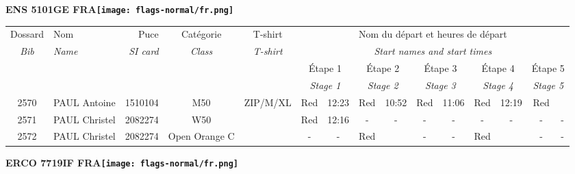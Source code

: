 \documentclass{report}
\begin{document}
\newpage
  \Huge \centering \bfseries ENS 5101GE FRA\normalfont \footnotesize \sffamily \hfill \texttt{[image: flags-normal/fr.png]} \newline 
  \begin{longtable}{|c|l|r|c|c|*{5}{cc|}}
    Dossard & Nom  & Puce    & Catégorie & T-shirt & \multicolumn{10}{c|}{Nom du départ et heures de départ} \\
    \itshape Bib     & \itshape Name & \itshape SI card & \itshape Class  & \itshape  T-shirt  & \multicolumn{10}{c|}{\itshape Start names and start times} \\
    \hline
    & & & & & \multicolumn{2}{c|}{Étape 1} & \multicolumn{2}{c|}{Étape 2} & \multicolumn{2}{c|}{Étape 3} & \multicolumn{2}{c|}{Étape 4} & \multicolumn{2}{c|}{Étape 5} \\
    & & & & & \multicolumn{2}{c|}{\itshape Stage 1} & \multicolumn{2}{c|}{\itshape Stage 2} & \multicolumn{2}{c|}{\itshape Stage 3} & \multicolumn{2}{c|}{\itshape Stage 4} & \multicolumn{2}{c|}{\itshape Stage 5} \\
    \hline
    2570 & PAUL Antoine & 1510104 & M50 & ZIP/M/XL & Red & 12:23 & Red & 10:52 & Red & 11:06 & Red & 12:19 & Red &  \\
    2571 & PAUL Christel & 2082274 & W50 &   & Red & 12:16 & - &  - & - &  - & - &  - & - &  -\\
    2572 & PAUL Christel & 2082274 & Open Orange C &   & - &  - & Red &   & - &  - & Red &   & - &  -\\
  \end{longtable}
\newpage
  \Huge \centering \bfseries ERCO 7719IF FRA\normalfont \footnotesize \sffamily \hfill \texttt{[image: flags-normal/fr.png]} \newline 
\end{document}
